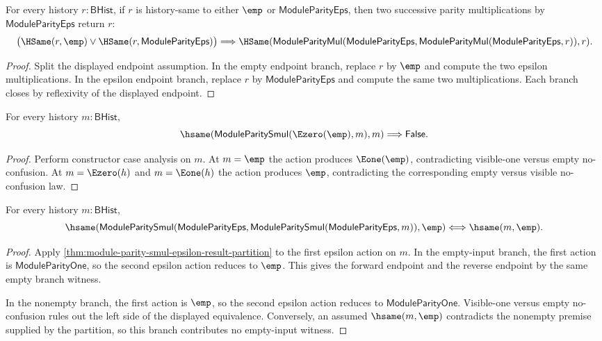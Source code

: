 \begin{theorem}
\label{thm:module-parity-mul-epsilon-boolean-orbit-involutive}
For every history $r:\mathsf{BHist}$, if $r$ is history-same to either
$\emp$ or $\mathsf{ModuleParityEps}$, then two successive parity
multiplications by $\mathsf{ModuleParityEps}$ return $r$:
$$
\bigl(\HSame(r,\emp)\lor \HSame(r,\mathsf{ModuleParityEps})\bigr)
\Longrightarrow
\HSame(\mathsf{ModuleParityMul}(\mathsf{ModuleParityEps},
  \mathsf{ModuleParityMul}(\mathsf{ModuleParityEps},r)),r).
$$
\end{theorem}
\begin{proof}
Split the displayed endpoint assumption. In the empty endpoint branch, replace
$r$ by $\emp$ and compute the two epsilon multiplications. In the epsilon
endpoint branch, replace $r$ by $\mathsf{ModuleParityEps}$ and compute the same
two multiplications. Each branch closes by reflexivity of the displayed
endpoint.
\end{proof}

\begin{theorem}
\label{thm:module-parity-smul-e0-empty-no-fixed-point}
For every history $m:\mathsf{BHist}$,
$$
\hsame(\mathsf{ModuleParitySmul}(\Ezero(\emp),m),m)
\Longrightarrow
\mathsf{False}.
$$
\end{theorem}
\begin{proof}
Perform constructor case analysis on $m$. At $m=\emp$ the action produces
$\Eone(\emp)$, contradicting visible-one versus empty no-confusion. At
$m=\Ezero(h)$ and $m=\Eone(h)$ the action produces $\emp$, contradicting the
corresponding empty versus visible no-confusion law.
\end{proof}

\begin{theorem}
\label{thm:module-parity-epsilon-double-action-empty-iff}
For every history $m:\mathsf{BHist}$,
$$
\hsame(\mathsf{ModuleParitySmul}(\mathsf{ModuleParityEps},
  \mathsf{ModuleParitySmul}(\mathsf{ModuleParityEps},m)),\emp)
\Longleftrightarrow
\hsame(m,\emp).
$$
\end{theorem}
\begin{proof}
Apply \autoref{thm:module-parity-smul-epsilon-result-partition} to the first
epsilon action on $m$. In the empty-input branch, the first action is
$\mathsf{ModuleParityOne}$, so the second epsilon action reduces to $\emp$.
This gives the forward endpoint and the reverse endpoint by the same empty
branch witness.

In the nonempty branch, the first action is $\emp$, so the second epsilon
action reduces to $\mathsf{ModuleParityOne}$. Visible-one versus empty
no-confusion rules out the left side of the displayed equivalence. Conversely,
an assumed $\hsame(m,\emp)$ contradicts the nonempty premise supplied by the
partition, so this branch contributes no empty-input witness.
\end{proof}
